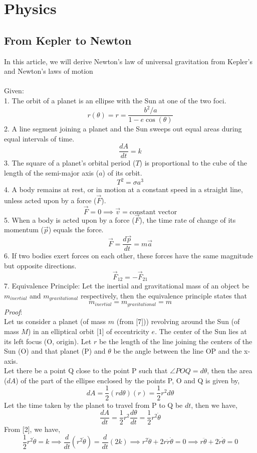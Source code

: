 \documentclass[12pt]{article}
\begin{document}
\section{Physics}
\subsection{From Kepler to Newton}
In this article, we will derive Newton's law of universal gravitation from Kepler's and Newton's laws of motion\\ \\
Given:\\
1. The orbit of a planet is an ellipse with the Sun at one of the two foci.
$$r(\theta) = r = \frac{b^2/a}{1-e\cos(\theta)}$$
2. A line segment joining a planet and the Sun sweeps out equal areas during equal intervals of time.
$$\frac{dA}{dt}=k$$
3. The square of a planet's orbital period ($T$) is proportional to the cube of the length of the semi-major axis ($a$) of its orbit.
$$T^2=\sigma a^3$$
4. A body remains at rest, or in motion at a constant speed in a straight line, unless acted upon by a force ($\vec F$).
$$\vec F = 0 \implies \vec v=\text{constant vector}$$
5. When a body is acted upon by a force ($\vec F$), the time rate of change of its momentum ($\vec p$) equals the force.
$$\vec F=\frac{d\vec p}{dt}=m\vec a$$
6. If two bodies exert forces on each other, these forces have the same magnitude but opposite directions.
$$\vec F_{12}=-\vec F_{21}$$
7. Equivalence Principle: Let the inertial and gravitational mass of an object be $m_{inertial}$ and $m_{gravitational}$ respectively, then the equivalence principle states that
$$m_{inertial}=m_{gravitational}=m$$
{\em Proof}:\\
Let us consider a planet (of mass $m$ (from [7])) revolving around the Sun (of mass $M$) in an elliptical orbit [1] of eccentricity $e$. The center of the Sun lies at its left focus (O, origin). Let $r$ be the length of the line joining the centers of the Sun (O) and that planet (P) and $\theta$ be the angle between the line OP and the x-axis.\\
Let there be a point Q close to the point P such that $\angle POQ = d\theta$, then the area ($dA$) of the part of the ellipse enclosed by the points P, O and Q is given by,
$$dA = \frac{1}{2}(rd\theta)(r)=\frac{1}{2}r^2d\theta$$
Let the time taken by the planet to travel from P to Q be $dt$, then we have,
$$\frac{dA}{dt} = \frac{1}{2}r^2\frac{d\theta}{dt}=\frac{1}{2}r^2\dot\theta$$
From [2], we have,
$$\frac{1}{2}r^2\dot\theta=k\implies \frac{d}{dt}(r^2\dot\theta)=\frac{d}{dt}(2k) \implies r^2\ddot{\theta}+2r\dot r\dot\theta=0 \implies r\ddot{\theta}+2\dot r\dot\theta=0$$
\end{document}
